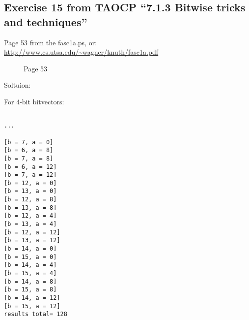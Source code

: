 \subsection{Exercise 15 from TAOCP ``7.1.3 Bitwise tricks and techniques''}

\renewcommand{\CURPATH}{equations/TAOCP_7_1_3_exercise_15}

Page 53 from the fasc1a.ps, or: \url{http://www.cs.utsa.edu/~wagner/knuth/fasc1a.pdf}

\begin{figure}[H]
\centering
{}
\caption{Page 53}
\end{figure}

Soltuion:



For 4-bit bitvectors:

\begin{lstlisting}

...

[b = 7, a = 0]
[b = 6, a = 8]
[b = 7, a = 8]
[b = 6, a = 12]
[b = 7, a = 12]
[b = 12, a = 0]
[b = 13, a = 0]
[b = 12, a = 8]
[b = 13, a = 8]
[b = 12, a = 4]
[b = 13, a = 4]
[b = 12, a = 12]
[b = 13, a = 12]
[b = 14, a = 0]
[b = 15, a = 0]
[b = 14, a = 4]
[b = 15, a = 4]
[b = 14, a = 8]
[b = 15, a = 8]
[b = 14, a = 12]
[b = 15, a = 12]
results total= 128
\end{lstlisting}

